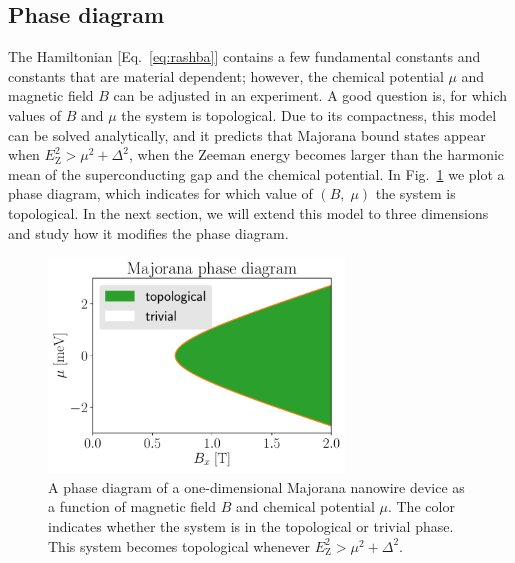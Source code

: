 \subsection{Phase diagram}\label{sec:phase_diagram_1D_intro}
The Hamiltonian [Eq.~\eqref{eq:rashba}] contains a few fundamental constants and constants that are material dependent; however, the chemical potential $\mu$ and magnetic field $B$ can be adjusted in an experiment.
A good question is, for which values of $B$ and $\mu$ the system is topological.
Due to its compactness, this model can be solved analytically, and it predicts that Majorana bound states appear when $E_\textrm{Z}^{2}>\mu^{2}+\Delta^{2}$, when the Zeeman energy becomes larger than the harmonic mean of the superconducting gap and the chemical potential.
In Fig.~\ref{fig:phase_diagram_1D} we plot a phase diagram, which indicates for which value of $\left(B,\; \mu\right)$ the system is topological.
In the next section, we will extend this model to three dimensions and study how it modifies the phase diagram.

\begin{figure}
\begin{center}
\includegraphics[width=0.7\textwidth]{chapter_introduction/figures/phase_diagram_1D.pdf}
\caption{A phase diagram of a one-dimensional Majorana nanowire device as a function of magnetic field $B$ and chemical potential $\mu$.
The color indicates whether the system is in the topological or trivial phase.
This system becomes topological whenever $E_\textrm{Z}^{2}>\mu^{2}+\Delta^{2}$.
\label{fig:phase_diagram_1D}}
\end{center}
\end{figure}




